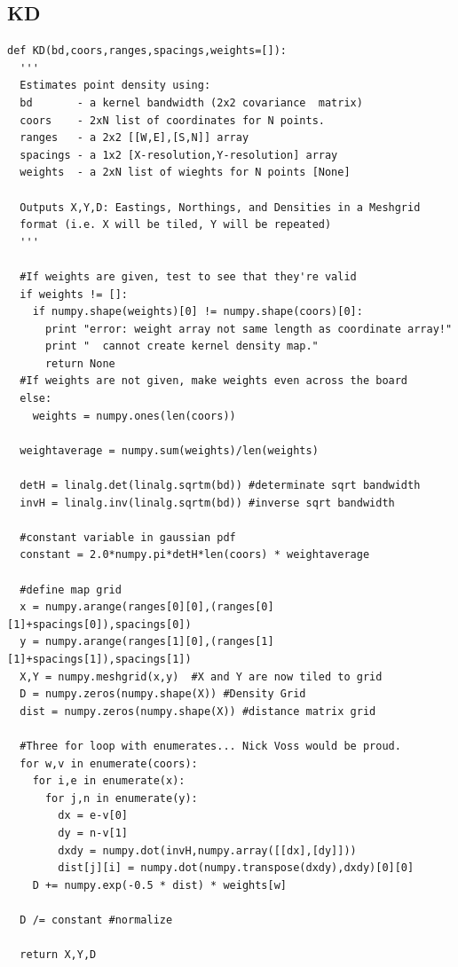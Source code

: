\documentclass[12pt,letter]{article}
\begin{document}
\subsection{KD}
\begin{verbatim}
def KD(bd,coors,ranges,spacings,weights=[]):
  '''
  Estimates point density using:
  bd       - a kernel bandwidth (2x2 covariance  matrix)
  coors    - 2xN list of coordinates for N points.
  ranges   - a 2x2 [[W,E],[S,N]] array
  spacings - a 1x2 [X-resolution,Y-resolution] array
  weights  - a 2xN list of wieghts for N points [None]
  
  Outputs X,Y,D: Eastings, Northings, and Densities in a Meshgrid
  format (i.e. X will be tiled, Y will be repeated)
  '''
  
  #If weights are given, test to see that they're valid
  if weights != []:
    if numpy.shape(weights)[0] != numpy.shape(coors)[0]:
      print "error: weight array not same length as coordinate array!"
      print "  cannot create kernel density map."
      return None
  #If weights are not given, make weights even across the board
  else:
    weights = numpy.ones(len(coors))
  
  weightaverage = numpy.sum(weights)/len(weights)
  
  detH = linalg.det(linalg.sqrtm(bd)) #determinate sqrt bandwidth
  invH = linalg.inv(linalg.sqrtm(bd)) #inverse sqrt bandwidth
  
  #constant variable in gaussian pdf
  constant = 2.0*numpy.pi*detH*len(coors) * weightaverage

  #define map grid
  x = numpy.arange(ranges[0][0],(ranges[0][1]+spacings[0]),spacings[0])
  y = numpy.arange(ranges[1][0],(ranges[1][1]+spacings[1]),spacings[1])
  X,Y = numpy.meshgrid(x,y)  #X and Y are now tiled to grid
  D = numpy.zeros(numpy.shape(X)) #Density Grid
  dist = numpy.zeros(numpy.shape(X)) #distance matrix grid
  
  #Three for loop with enumerates... Nick Voss would be proud.
  for w,v in enumerate(coors):
    for i,e in enumerate(x):
      for j,n in enumerate(y):
        dx = e-v[0]
        dy = n-v[1]
        dxdy = numpy.dot(invH,numpy.array([[dx],[dy]]))
        dist[j][i] = numpy.dot(numpy.transpose(dxdy),dxdy)[0][0]
    D += numpy.exp(-0.5 * dist) * weights[w]
  
  D /= constant #normalize
  
  return X,Y,D
\end{verbatim}
\end{document}
